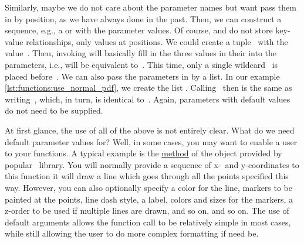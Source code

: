Similarly, maybe we do not care about the parameter names but want pass them in by position, as we have always done in the past.
Then, we can construct a sequence, e.g., a  or  with the parameter values.
Of course,  and  do not store key-value relationships, only values at positions.
We could create a tuple~ with the value~.
Then, invoking  will basically fill in the three values in their into the parameters, i.e., will be equivalent to~.
This time, only a single wildcard~\pythonil{*} is placed before~.
We can also pass the parameters in by  a list.
In our example \cref{lst:functions:use_normal_pdf}, we create the list .
Calling~ then is the same as writing~, which, in turn, is identical to~.
Again, parameters with default values do not need to be supplied.

At first glance, the use of all of the above is not entirely clear.
What do we need default parameter values for?
Well, in some cases, you may want to enable a user to  your functions.
A typical example is the \href{https://matplotlib.org/stable/api/_as_gen/matplotlib.axes.Axes.plot.html}{ method} of the  object provided by popular \matplotlib\ library.
You will normally provide a sequence of x-\ and y\nobreakdashes-coordinates to this function it will draw a line which goes through all the points specified this way.
However, you can also optionally specify a color for the line, markers to be painted at the points, line dash style, a label, colors and sizes for the markers, a z\nobreakdashes-order to be used if multiple lines are drawn, and so on, and so on.
The use of default arguments allows the function call to be relatively simple in most cases, while still allowing the user to do more complex formatting if need be.

